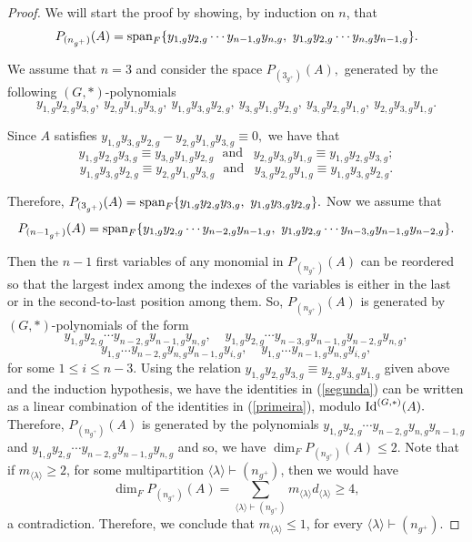 \documentclass{amsart}
\newcommand{\IdG}{\ensuremath{\textnormal{Id}^{(G,\ast)}}}
\newcommand{\spam}{\ensuremath{\textnormal{span}}}
\numberwithin{equation}{section}
\begin{document}
 \begin{proof}
    We will start the proof by showing, by induction on $n$, that $$P_{(n_{g^+})}(A)=\spam_F\{y_{1,g}y_{2,g}\cdots y_{n-1,g}y_{n,g}, ~y_{1,g}y_{2,g}\cdots y_{n,g}y_{n-1,g}\}.$$

     We assume that $n=3$ and consider the space $P_{(3_{g^+})}(A),$ generated by the following $(G,*)$-polynomials 
    $$y_{1,g}y_{2,g}y_{3,g} , ~y_{2,g}y_{1,g}y_{3,g}, ~y_{1,g}y_{3,g}y_{2,g}, ~y_{3,g}y_{1,g}y_{2,g}, ~y_{3,g}y_{2,g}y_{1,g}, ~y_{2,g}y_{3,g}y_{1,g}.$$
    
    Since $A$ satisfies $y_{1,g}y_{3,g}y_{2,g}-y_{2,g}y_{1,g}y_{3,g}\equiv 0,$ we have that 
    $$y_{1,g}y_{2,g}y_{3,g}\equiv y_{3,g} y_{1,g}y_{2,g}\,\,\mbox{ and }\,\,\,y_{2,g}y_{3,g}y_{1,g} \equiv y_{1,g} y_{2,g}y_{3,g};$$
    $$y_{1,g}y_{3,g}y_{2,g} \equiv y_{2,g}y_{1,g}y_{3,g} \,\,\mbox{ and }\,\,\,y_{3,g}y_{2,g}y_{1,g}\equiv y_{1,g} y_{3,g}y_{2,g} .$$

    Therefore, $P_{(3_{g^+})}(A) = \spam_F\{y_{1,g}y_{2,g}y_{3,g}, ~y_{1,g}y_{3,g}y_{2,g} \}.$ Now we 
    assume that $$P_{({n-1}_{g^+})}(A)=\spam_F\{y_{1,g}y_{2,g}\cdots y_{n-2,g}y_{n-1,g}, ~y_{1,g}y_{2,g}\cdots y_{n-3,g}y_{n-1,g}y_{n-2,g}\}. $$ 
    
    Then the $n-1$ first variables of any monomial in $P_{({n}_{g^+})}(A)$ can be reordered so that the largest index among the indexes of the variables is either in the last or in the second-to-last position among them. So, $P_{({n}_{g^+})}(A)$ is generated by $(G,*)$-polynomials of the form 
    \begin{equation}\label{primeira}
    y_{1,g}y_{2,g}\cdots y_{n-2,g}y_{n-1,g}y_{n,g},\;\;\; ~y_{1,g}y_{2,g}\cdots y_{n-3,g}y_{n-1,g}y_{n-2,g}y_{n,g},
    \end{equation}
\begin{equation}\label{segunda}
    y_{1,g}\ldots y_{n-2,g}y_{n,g}y_{n-1,g}y_{i,g},\;\;\; ~ y_{1,g}\ldots y_{n-1,g}y_{n,g}y_{i,g},
    \end{equation}
    for some $1\leq i\leq n-3.$ Using the relation $y_{1,g}y_{2,g}y_{3,g}\equiv y_{2,g}y_{3,g}y_{1,g}$ given above and the induction hypothesis, we have the identities in (\ref{segunda}) can be written as a linear combination of the identities in (\ref{primeira}), modulo $\IdG(A).$ 
    Therefore, $P_{({n}_{g^+})}(A)$ is generated by the polynomials $y_{1,g}y_{2,g}\cdots y_{n-2,g}y_{n,g}y_{n-1, g}$ and $y_{1,g}y_{2,g}\cdots y_{n-2,g}y_{n-1,g}y_{n,g}$ and so, we have $\dim _F P_{(n_{g^+})}(A)\le 2$. Note that if $m_{\langle \lambda \rangle} \geq 2$, for some multipartition $\langle \lambda \rangle\vdash (n_{g^+})$, then we would have $$\dim_F P_{(n_{g^+})}(A)= \sum\limits_{\langle \lambda \rangle \vdash (n_{g^+})} {m_{\langle \lambda \rangle}d_{\langle \lambda \rangle}}\ge 4,$$ a contradiction. Therefore,  we conclude that $m_{\langle \lambda \rangle}\leq 1$, for every $\langle \lambda \rangle\vdash (n_{g^+})$.  
     \end{proof} 
\end{document}

